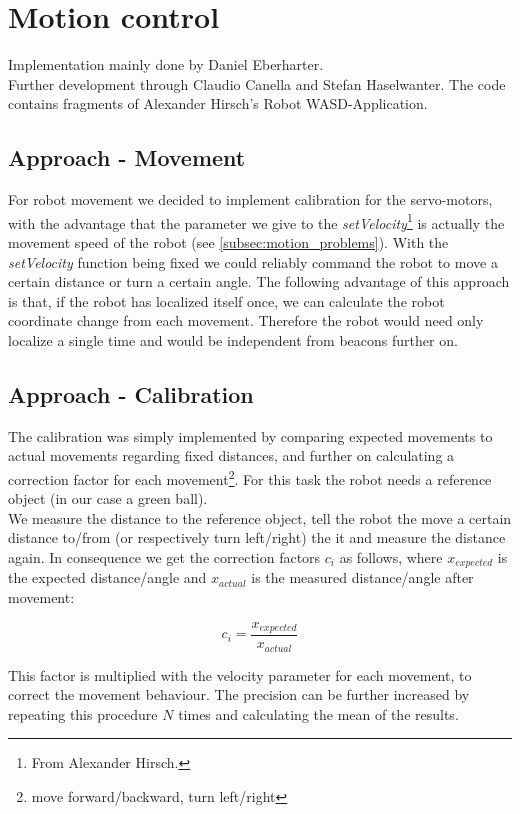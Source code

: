 \documentclass[703031]{iisreport}
\begin{document}
\section{Motion control}
\label{sec:motion}
Implementation mainly done by Daniel Eberharter.\\
Further development through Claudio Canella and Stefan Haselwanter.
The code contains fragments of Alexander Hirsch's Robot WASD-Application.

\subsection{Approach - Movement}
For robot movement we decided to implement calibration for the servo-motors, with the advantage that the parameter we give to the \emph{setVelocity}\footnote{From Alexander Hirsch.} is 
actually the movement speed of the robot (see \ref{subsec:motion_problems}). With the \emph{setVelocity} function being fixed we could reliably command the robot to move a certain distance or turn a certain angle.
The following advantage of this approach is that, if the robot has localized itself once, we can calculate the robot coordinate change from each movement. Therefore the robot would need only localize a single time and would be independent from beacons further on.

\subsection{Approach - Calibration}
The calibration was simply implemented by comparing expected movements to actual movements regarding fixed distances, and further on calculating a correction factor for each movement\footnote{move forward/backward, turn left/right}. For this task the robot needs a reference object (in our case a green ball). \\
We measure the distance to the reference object, tell the robot the move a certain distance to/from (or respectively turn left/right) the it and measure the distance again. In consequence
we get the correction factors $c_i$ as follows, where $x_{expected}$ is the expected distance/angle and $x_{actual}$ is the measured distance/angle after movement:

	\[c_i = \frac{x_{expected}}{x_{actual}}\]

This factor is multiplied with the velocity parameter for each movement, to correct the movement behaviour. The precision can be further increased by repeating this procedure $N$ times and calculating the mean of the results.
\end{document}
